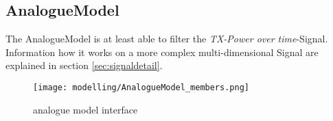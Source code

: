 \subsection{AnalogueModel}



%

The AnalogueModel is at least able to filter the \emph{TX-Power over time}-Signal.\\

Information how it works on a more complex multi-dimensional Signal are
explained in section \ref{sec:signaldetail}.
 
\begin{figure}[H]
 \centering
 \texttt{[image: modelling/AnalogueModel\_members.png]}
 \caption{analogue model interface}
 \label{fig: analogue model interface}
\end{figure}
%


